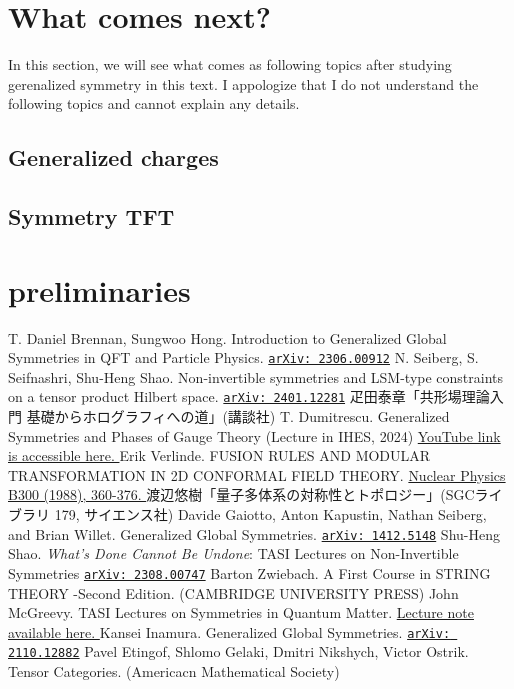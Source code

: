 \documentclass{ltjsarticle}
\theoremstyle{mystyle} %
\numberwithin{equation}{section}
\begin{document}
\section{What comes next?}
In this section, we will see what comes as following topics after studying gerenalized symmetry in this text. 
I appologize that I do not understand the following topics and cannot explain any details. 
\subsection{Generalized charges}
\subsection{Symmetry TFT}
\newpage
\section{preliminaries}

\begin{thebibliography}{99}
     T. Daniel Brennan, Sungwoo Hong. 
    Introduction to Generalized Global Symmetries in QFT and Particle Physics. \href{https://arxiv.org/abs/2306.00912}{\texttt{arXiv: 2306.00912}}
     N. Seiberg, S. Seifnashri, Shu-Heng Shao. 
    Non-invertible symmetries and LSM-type constraints on a tensor product Hilbert space. 
    \href{https://arxiv.org/pdf/2401.12281}{\texttt{arXiv: 2401.12281}}
     疋田泰章「共形場理論入門 基礎からホログラフィへの道」(講談社)
     T. Dumitrescu. Generalized Symmetries and Phases of Gauge Theory 
    (Lecture in IHES, 2024) \href{https://www.youtube.com/watch?v=9pqtqyGtt3M&t=3760s}{YouTube link is accessible here. }
     Erik Verlinde. 
    FUSION RULES AND MODULAR TRANSFORMATION IN 2D CONFORMAL FIELD THEORY. 
    \href{https://tianyuan.scu.edu.cn/upload/default/20220602/Verlinde_Fusion_rules_and_modular_transformations%20in%202D%20CFT.pdf}{Nuclear Physics B300 (1988), 360-376. }
     渡辺悠樹「量子多体系の対称性とトポロジー」(SGCライブラリ 179, サイエンス社)
     Davide Gaiotto, Anton Kapustin, Nathan Seiberg, and Brian Willet. 
    Generalized Global Symmetries. 
    \href{https://arxiv.org/pdf/1412.5148}{\texttt{arXiv: 1412.5148}}
     Shu-Heng Shao. 
    \textit{What's Done Cannot Be Undone}: TASI Lectures on Non-Invertible Symmetries
    \href{https://arxiv.org/pdf/2308.00747}{\texttt{arXiv: 2308.00747}}
     Barton Zwiebach. 
    A First Course in STRING THEORY -Second Edition. (CAMBRIDGE UNIVERSITY PRESS)
    John McGreevy. TASI Lectures on Symmetries in Quantum Matter. 
    \href{https://mcgreevy.physics.ucsd.edu/talks/2023-TASI-lectures.pdf}{Lecture note available here. }
     Kansei Inamura. 
    Generalized Global Symmetries. 
    \href{https://arxiv.org/pdf/2110.12882}{\texttt{arXiv: 2110.12882}}
     Pavel Etingof, Shlomo Gelaki, Dmitri Nikshych, Victor Ostrik. 
    Tensor Categories. (Americacn Mathematical Society)
\end{thebibliography}
\end{document}
